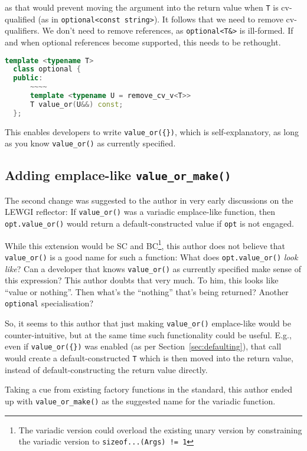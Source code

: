\documentclass[11pt]{article}
\begin{document}
as that would prevent moving the argument into the return value when
\texttt{T} is cv-qualified (as in \texttt{optional<const string>}). It
follows that we need to remove cv-qualifiers. We don't need to remove
references, as \texttt{optional<T\&>} is ill-formed. If and when
optional references become supported, this needs to be rethought.

\begin{lstlisting}[language=c++]
  template <typename T>
  class optional {
  public:
      ~~~~
      template <typename U = remove_cv_v<T>>
      T value_or(U&&) const;
  };
\end{lstlisting}

This enables developers to write \texttt{value\_or(\{\})}, which is
self-explanatory, as long as you know \texttt{value\_or()} as
currently specified.

\subsection{Adding emplace-like \texttt{value\_or\_make()}}
\label{sec:emplace}

The second change was suggested to the author in very early
discussions on the LEWGI reflector: If \texttt{value\_or()} was a
variadic emplace-like function, then \texttt{opt.value\_or()} would
return a default-constructed value if \texttt{opt} is not engaged.

While this extension would be SC and BC\footnote{The variadic version
  could overload the existing unary version by constraining the
  variadic version to \texttt{sizeof...(Args) != 1}}, this author does
not believe that \texttt{value\_or()} is a good name for such a
function: What does \texttt{opt.value\_or()} \emph{look like}? Can a
developer that knows \texttt{value\_or()} as currently specified make
sense of this expression? This author doubts that very much. To him,
this looks like ``value or nothing''. Then what's the ``nothing''
that's being returned?  Another \texttt{optional} specialisation?

So, it seems to this author that just making \texttt{value\_or()}
emplace-like would be counter-intuitive, but at the same time such
functionality could be useful. E.g., even if \texttt{value\_or(\{\})}
was enabled (as per Section~\ref{sec:defaulting}), that call would
create a default-constructed \texttt{T} which is then moved into the
return value, instead of default-constructing the return value
directly.

Taking a cue from existing factory functions in the standard, this
author ended up with \texttt{value\_or\_make()} as the suggested name
for the variadic function.
\end{document}
